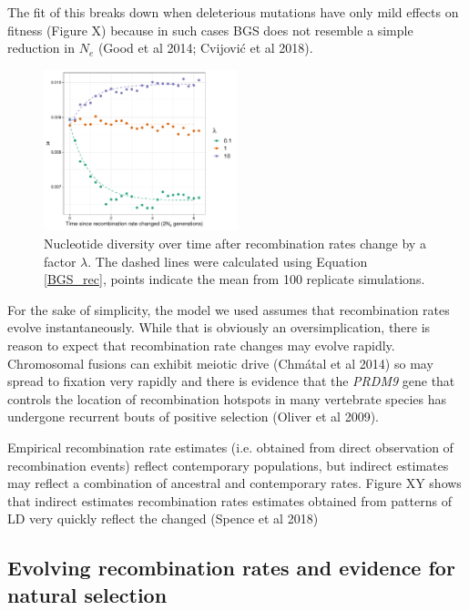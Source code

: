 \documentclass[10pt,twoside, twocolumn]{GSA_format}
\begin{document}
The fit of this breaks down when deleterious mutations have only mild effects on fitness (Figure X) because in such cases BGS does not resemble a simple reduction in $N_e$ (Good et al 2014; Cvijović et al 2018). 

\vspace{5px}


\begin{figure}[H]
\includegraphics[width=0.5\textwidth]{../TheoreticalExpectation/B_over_time_fixed_s_plot_singlePanel}
\caption{Nucleotide diversity over time after recombination rates change by a factor $\lambda$. The dashed lines were calculated using Equation \ref{BGS_rec}, points indicate the mean from 100 replicate simulations.}
\label{fig:BGS_over_time_fixed_s}
\end{figure}

For the sake of simplicity, the model we used assumes that recombination rates evolve instantaneously. While that is obviously an oversimplication, there is reason to expect that recombination rate changes may evolve rapidly. Chromosomal fusions can exhibit meiotic drive (Chmátal et al 2014) so may spread to fixation very rapidly and there is evidence that the \textit{PRDM9} gene that controls the location of recombination hotspots in many vertebrate species has undergone recurrent bouts of positive selection (Oliver et al 2009). 

\vspace{5px}

Empirical recombination rate estimates (i.e. obtained from direct observation of recombination events) reflect contemporary populations, but indirect estimates may reflect a combination of ancestral and contemporary rates. Figure XY shows that indirect estimates recombination rates estimates obtained from patterns of LD very quickly reflect the changed (Spence et al 2018) 



\subsection{Evolving recombination rates and evidence for natural selection}
\end{document}

